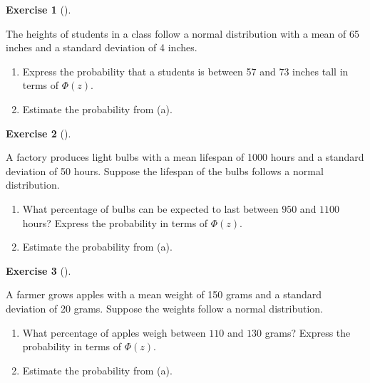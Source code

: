 \documentclass[
  letterpaper,
  DIV=11,
  numbers=noendperiod]{scrreprt}
\providecommand{\tightlist}{%
  \setlength{\itemsep}{0pt}\setlength{\parskip}{0pt}}\usepackage{longtable,booktabs,array}
\theoremstyle{definition}
\newtheorem{exercise}{Exercise}[chapter]
\theoremstyle{definition}
\theoremstyle{definition}
\theoremstyle{remark}
\begin{document}
\begin{exercise}[]\protect\hypertarget{exr-9.12}{}\label{exr-9.12}

The heights of students in a class follow a normal distribution with a
mean of 65 inches and a standard deviation of 4 inches.

\begin{enumerate}
\def\labelenumi{\alph{enumi}.}
\tightlist
\item
  Express the probability that a students is between 57 and 73 inches
  tall in terms of \(\Phi(z)\).
\item
  Estimate the probability from (a).
\end{enumerate}

\end{exercise}

\begin{exercise}[]\protect\hypertarget{exr-9.13}{}\label{exr-9.13}

A factory produces light bulbs with a mean lifespan of 1000 hours and a
standard deviation of 50 hours. Suppose the lifespan of the bulbs
follows a normal distribution.

\begin{enumerate}
\def\labelenumi{\alph{enumi}.}
\tightlist
\item
  What percentage of bulbs can be expected to last between \(950\) and
  \(1100\) hours? Express the probability in terms of \(\Phi(z)\).
\item
  Estimate the probability from (a).
\end{enumerate}

\end{exercise}

\begin{exercise}[]\protect\hypertarget{exr-9.14}{}\label{exr-9.14}

A farmer grows apples with a mean weight of 150 grams and a standard
deviation of 20 grams. Suppose the weights follow a normal distribution.

\begin{enumerate}
\def\labelenumi{\alph{enumi}.}
\tightlist
\item
  What percentage of apples weigh between \(110\) and \(130\) grams?
  Express the probability in terms of \(\Phi(z)\).
\item
  Estimate the probability from (a).
\end{enumerate}

\end{exercise}
\end{document}
